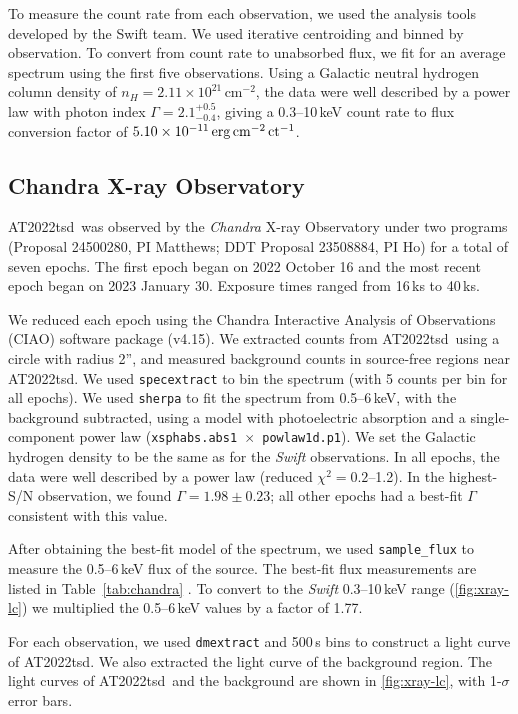 \documentclass{nature_plusfigure}
\newcommand{\at}{AT2022tsd}
\begin{document}
\begin{methods}
To measure the count rate from each observation, we used the analysis tools developed by the Swift team\cite{Evans2007,Evans2009}.
We used iterative centroiding and binned by observation. 
To convert from count rate to unabsorbed flux, we fit for an average spectrum using the first five observations. Using a Galactic neutral hydrogen column density\cite{Willingale2013} of $n_H=2.11\times10^{21}\,$cm$^{-2}$, the data were well described by a power law with photon index $\Gamma=2.1^{+0.5}_{-0.4}$, 
giving a 0.3--10\,keV count rate to flux conversion factor of $5.10\times 10^{-11}\,\rm erg\,cm^{-2}\,ct^{-1}$.

\subsection{Chandra X-ray Observatory}
\label{sec:chandra}

\at\ was observed by the \emph{Chandra} X-ray Observatory under two programs (Proposal 24500280, PI Matthews; DDT Proposal 23508884, PI Ho) for a total of seven epochs. The first epoch began on 2022 October 16 and the most recent epoch began on 2023 January 30. Exposure times ranged from 16\,ks to 40\,ks.

We reduced each epoch using the Chandra Interactive Analysis of Observations (CIAO\cite{Fruscione2006}) software package (v4.15). We extracted counts from \at\ using a circle with radius 2'', and measured background counts in source-free regions near \at.
We used \texttt{specextract} to bin the spectrum (with 5 counts per bin for all epochs). We used \texttt{sherpa} to fit the spectrum from 0.5--6\,keV, with the background subtracted, using a model with photoelectric absorption and a single-component power law (\texttt{xsphabs.abs1 $\times$ powlaw1d.p1}). We set the Galactic hydrogen density to be the same as for the \emph{Swift} observations. In all epochs, the data were well described by a power law (reduced $\chi^2=0.2$--1.2). In the highest-S/N observation, we found $\Gamma=1.98\pm0.23$; all other epochs had a best-fit $\Gamma$ consistent with this value.

After obtaining the best-fit model of the spectrum, we used \texttt{sample\_flux} to measure the 0.5--6\,keV flux of the source. The best-fit flux measurements are listed in Table~\ref{tab:chandra} . To convert to the \emph{Swift} 0.3--10\,keV range (\ref{fig:xray-lc}) we multiplied the 0.5--6\,keV values by a factor of 1.77.

For each observation, we used \texttt{dmextract} and 500\,s bins to construct a light curve of \at. We also extracted the light curve of the background region. The light curves of \at\ and the background are shown in \ref{fig:xray-lc}, with 1-$\sigma$ error bars.


\end{methods}
\end{document}
